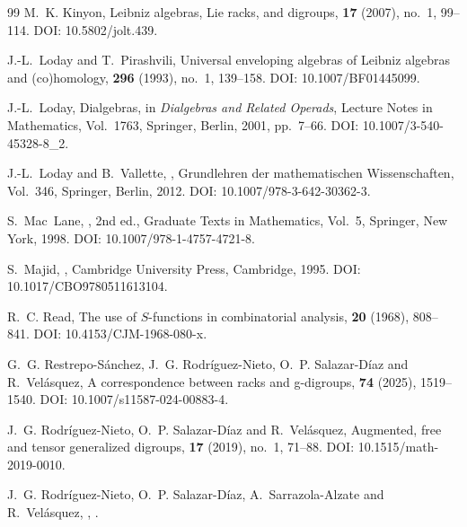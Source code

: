\documentclass[11pt]{article}
\theoremstyle{plain}
\theoremstyle{definition}
\theoremstyle{remark}
\begin{document}
\begin{thebibliography}{99}
		M.~K. Kinyon,
		\newblock Leibniz algebras, Lie racks, and digroups,
		 \textbf{17} (2007), no.~1, 99--114.
		\newblock DOI: 10.5802/jolt.439.
		
		J.-L.~Loday and T.~Pirashvili,
		\newblock Universal enveloping algebras of Leibniz algebras and (co)homology,
		 \textbf{296} (1993), no.~1, 139--158.
		\newblock DOI: 10.1007/BF01445099.
		
		J.-L.~Loday,
		\newblock Dialgebras,
		\newblock in {\em Dialgebras and Related Operads},
		\newblock Lecture Notes in Mathematics, Vol.~1763, Springer, Berlin, 2001, pp.~7--66.
		\newblock DOI: 10.1007/3-540-45328-8\_2.
		
		J.-L.~Loday and B.~Vallette,
		,
		\newblock Grundlehren der mathematischen Wissenschaften, Vol.~346, Springer, Berlin, 2012.
		\newblock DOI: 10.1007/978-3-642-30362-3.
		
		S.~Mac~Lane,
		,
		\newblock 2nd ed., Graduate Texts in Mathematics, Vol.~5, Springer, New York, 1998.
		\newblock DOI: 10.1007/978-1-4757-4721-8.
		
		S.~Majid,
		,
		\newblock Cambridge University Press, Cambridge, 1995.
		\newblock DOI: 10.1017/CBO9780511613104.
		
		R.~C. Read,
		\newblock The use of $S$-functions in combinatorial analysis,
		 \textbf{20} (1968), 808--841.
		\newblock DOI: 10.4153/CJM-1968-080-x.
		
		G.~G. Restrepo-S\'anchez, J.~G. Rodr\'iguez-Nieto, O.~P. Salazar-D\'iaz and R.~Vel\'asquez,
		\newblock A correspondence between racks and g-digroups,
		 \textbf{74} (2025), 1519--1540.
		\newblock DOI: 10.1007/s11587-024-00883-4.
		
		J.~G. Rodr\'iguez-Nieto, O.~P. Salazar-D\'iaz and R.~Vel\'asquez,
		\newblock Augmented, free and tensor generalized digroups,
		 \textbf{17} (2019), no.~1, 71--88.
		\newblock DOI: 10.1515/math-2019-0010.
		
		 J.~G. Rodr\'iguez-Nieto, O.~P. Salazar-D\'iaz, A.~Sarrazola-Alzate and R.~Vel\'asquez, , .
		

\end{thebibliography}
\end{document}

